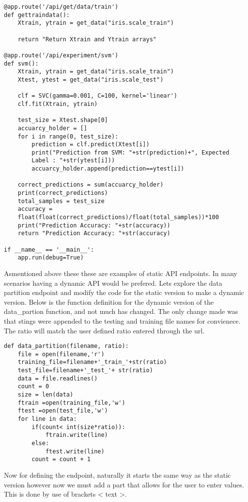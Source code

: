 \begin{lstlisting}
@app.route('/api/get/data/train')
def gettraindata():
    Xtrain, ytrain = get_data("iris.scale_train")
    
    return "Return Xtrain and Ytrain arrays"

@app.route('/api/experiment/svm')
def svm():
    Xtrain, ytrain = get_data("iris.scale_train")
    Xtest, ytest = get_data("iris.scale_test")

    clf = SVC(gamma=0.001, C=100, kernel='linear')
    clf.fit(Xtrain, ytrain)

    test_size = Xtest.shape[0]
    accuarcy_holder = []
    for i in range(0, test_size):
        prediction = clf.predict(Xtest[i])
        print("Prediction from SVM: "+str(prediction)+", Expected
        Label : "+str(ytest[i]))
        accuarcy_holder.append(prediction==ytest[i])

    correct_predictions = sum(accuarcy_holder)
    print(correct_predictions)
    total_samples = test_size
    accuracy =
    float(float(correct_predictions)/float(total_samples))*100
    print("Prediction Accuracy: "+str(accuracy))
    return "Prediction Accuracy: "+str(accuracy)

if __name__ == '__main__':
    app.run(debug=True)
\end{lstlisting}

Asmentioned above these these are examples of static API endpoints. In
many scenarios having a dynamic API would be prefered. Lets explore
the data partition endpoint and modify the code for the static version
to make a dynamic version. Below is the function definition for the
dynamic version of the data\_partion function, and not much has
changed. The only change made was that stings were appended to the
testing and training file names for convienece. The ratio will match
the user defined ratio entered through the url.   

\begin{lstlisting}
def data_partition(filename, ratio):
    file = open(filename,'r')
    training_file=filename+'_train_'+str(ratio)
    test_file=filename+'_test_'+ str(ratio)
    data = file.readlines()
    count = 0
    size = len(data)
    ftrain =open(training_file,'w')
    ftest =open(test_file,'w')
    for line in data:
        if(count< int(size*ratio)):
            ftrain.write(line)
        else:
            ftest.write(line)
        count = count + 1 
\end{lstlisting}

Now for defining the endpoint, naturally it starts the same way as the
static version however now we must add a part that allows for the user
to enter values. This is done by use of brackets < text >. 

